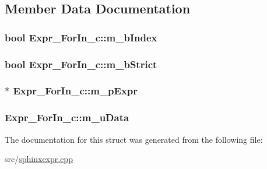 \subsection{Member Data Documentation}
\hypertarget{structExpr__ForIn__c_ae1fc4fb8be91ec47c1c1f289698d16df}{
\subsubsection[{m\-\_\-b\-Index}]{\setlength{\rightskip}{0pt plus 5cm}bool Expr\-\_\-\-For\-In\-\_\-c\-::m\-\_\-b\-Index}}\label{structExpr__ForIn__c_ae1fc4fb8be91ec47c1c1f289698d16df}
\hypertarget{structExpr__ForIn__c_a31b2c081e20fc3b0c7e0d8e44e6bd011}{
\subsubsection[{m\-\_\-b\-Strict}]{\setlength{\rightskip}{0pt plus 5cm}bool Expr\-\_\-\-For\-In\-\_\-c\-::m\-\_\-b\-Strict}}\label{structExpr__ForIn__c_a31b2c081e20fc3b0c7e0d8e44e6bd011}
\hypertarget{structExpr__ForIn__c_aa5e499f0759c25c99066f1d490198655}{
\subsubsection[{m\-\_\-p\-Expr}]{$\ast$ Expr\-\_\-\-For\-In\-\_\-c\-::m\-\_\-p\-Expr}}\label{structExpr__ForIn__c_aa5e499f0759c25c99066f1d490198655}
\hypertarget{structExpr__ForIn__c_a20725d306bdaa82332ec2a32a54a72f6}{
\subsubsection[{m\-\_\-u\-Data}]{ Expr\-\_\-\-For\-In\-\_\-c\-::m\-\_\-u\-Data\hspace{0.3cm}{\ttfamily [mutable]}}}\label{structExpr__ForIn__c_a20725d306bdaa82332ec2a32a54a72f6}


The documentation for this struct was generated from the following file\-:\begin{DoxyCompactItemize}
\item 
src/\hyperlink{sphinxexpr_8cpp}{sphinxexpr.\-cpp}\end{DoxyCompactItemize}
